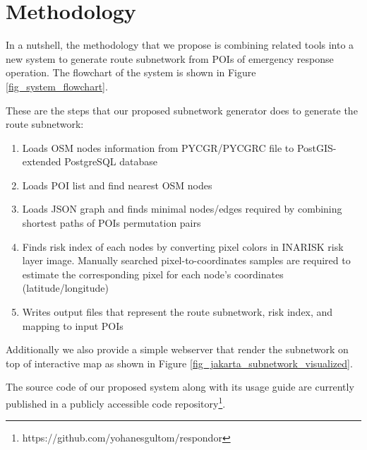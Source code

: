 \documentclass[conference]{IEEEtran}
\begin{document}
\section{Methodology}

In a nutshell, the methodology that we propose is combining related tools into a new system to generate route subnetwork from POIs of emergency response operation. The flowchart of the system is shown in Figure \ref{fig_system_flowchart}.

These are the steps that our proposed subnetwork generator does to generate the route subnetwork:

\begin{enumerate}
\item Loads OSM nodes information from PYCGR/PYCGRC file to PostGIS-extended PostgreSQL database
\item Loads POI list and find nearest OSM nodes
\item Loads JSON graph and finds minimal nodes/edges required by combining shortest paths of POIs permutation pairs
\item Finds risk index of each nodes by converting pixel colors in INARISK risk layer image. Manually searched pixel-to-coordinates samples are required to estimate the corresponding pixel for each node's coordinates (latitude/longitude)
\item Writes output files that represent the route subnetwork, risk index, and mapping to input POIs
\end{enumerate}

Additionally we also provide a simple webserver that render the subnetwork on top of interactive map as shown in Figure \ref{fig_jakarta_subnetwork_visualized}.

The source code of our proposed system along with its usage guide are currently published in a publicly accessible code repository\footnote{https://github.com/yohanesgultom/respondor}. 
\end{document}
